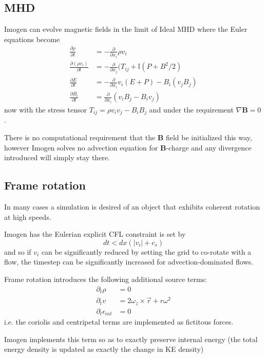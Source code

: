 \documentclass[letterpaper,12pt]{article}
\begin{document}
\subsection{MHD}

Imogen can evolve magnetic fields in the limit of Ideal MHD where the Euler equations
become
\begin{align*}
\frac{\partial \rho}{\partial t} &= -\frac{\partial}{\partial x_i} \rho v_i \\
\frac{\partial (\rho v_i)}{\partial t} &= -\frac{\partial}{\partial x_j} (T_{ij} + \mathbb{I}(P+B^2/2) \\
\frac{\partial E}{\partial t} &= -\frac{\partial}{\partial x_i} v_i (E + P) - B_i (v_j B_j) \\
\frac{\partial B_i}{\partial t} &= \frac{\partial}{\partial x_i} (v_i B_j - B_i v_j)
\end{align*}
now with the stress tensor $T_{ij} = \rho v_i v_j - B_i B_j$ and under the requirement
$\nabla \mathbf{B} = 0$.

There is no computational requirement that the \textbf{B} field be initialized this way,
however Imogen solves no advection equation for $\mathbf{B}$-charge and any divergence
introduced will simply stay there.

\subsection{Frame rotation}

In many cases a simulation is desired of an object that exhibits coherent rotation at
high speeds.

Imogen has the Eulerian explicit CFL constraint is set by
\[ dt < dx (|v_i| + c_s) \]
and so if $v_i$ can be significantly reduced by setting the grid to co-rotate with a flow,
the timestep can be significantly increased for advection-dominated flows.

Frame rotation introduces the following additional source terms:
\begin{align*}
\partial_t \rho &= 0 \\
\partial_t v &= 2 \omega_z \times \vec{r} + \hat{r} \omega^2 \\
\partial_t \epsilon_{int} &= 0
\end{align*}
i.e. the coriolis and centripetal terms are implemented as fictitous forces.

Imogen implements this term so as to exactly preserve internal energy (the total
energy density is updated as exactly the change in KE density)
\end{document}
